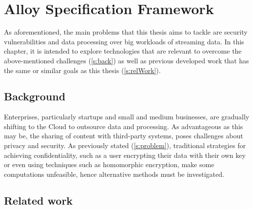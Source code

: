 \chapter{Alloy Specification Framework}\label{c:alloy}

As aforementioned, the main problems that this thesis aims to tackle are security vulnerabilities and data processing over big workloads of streaming data. In this chapter, it is intended to explore technologies that are relevant to overcome the above-mentioned challenges (\ref{s:back}) as well as previous developed work that has the same or similar goals as this thesis (\ref{s:relWork}).

\section{Background}\label{s:alloy-back}

Enterprises, particularly startups and small and medium businesses, are gradually shifting to the Cloud to outsource data and processing. \cite{6227695} As advantageous as this may be, the sharing of content with third-party systems, poses challenges about privacy and security. As previously stated (\ref{s:problem}), traditional strategies for achieving confidentiality, such as a user encrypting their data with their own key or even using techniques such as homomorphic encryption, make some computations unfeasible, hence alternative methods must be investigated.



\section{Related work}\label{s:alloy-relWork}
